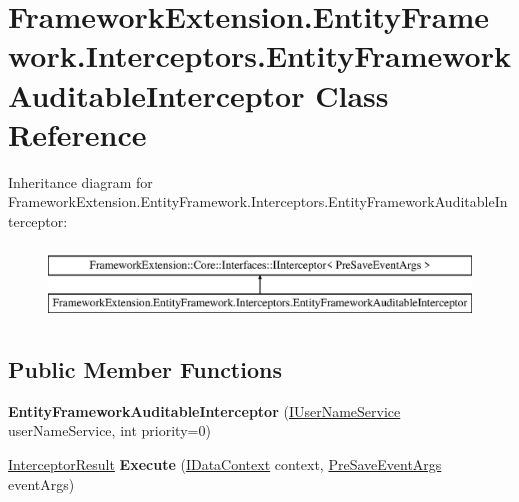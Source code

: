 \hypertarget{class_framework_extension_1_1_entity_framework_1_1_interceptors_1_1_entity_framework_auditable_interceptor}{\section{Framework\-Extension.\-Entity\-Framework.\-Interceptors.\-Entity\-Framework\-Auditable\-Interceptor Class Reference}
\label{class_framework_extension_1_1_entity_framework_1_1_interceptors_1_1_entity_framework_auditable_interceptor}
}
Inheritance diagram for Framework\-Extension.\-Entity\-Framework.\-Interceptors.\-Entity\-Framework\-Auditable\-Interceptor\-:\begin{figure}[H]
\begin{center}
\leavevmode
\includegraphics[height=2.000000cm]{class_framework_extension_1_1_entity_framework_1_1_interceptors_1_1_entity_framework_auditable_interceptor}
\end{center}
\end{figure}
\subsection*{Public Member Functions}
\begin{DoxyCompactItemize}
\item 
\hypertarget{class_framework_extension_1_1_entity_framework_1_1_interceptors_1_1_entity_framework_auditable_interceptor_a575bdb30c81c12e567676d17d170aff2}{{\bfseries Entity\-Framework\-Auditable\-Interceptor} (\hyperlink{interface_framework_extension_1_1_core_1_1_interfaces_1_1_i_user_name_service}{I\-User\-Name\-Service} user\-Name\-Service, int priority=0)}\label{class_framework_extension_1_1_entity_framework_1_1_interceptors_1_1_entity_framework_auditable_interceptor_a575bdb30c81c12e567676d17d170aff2}

\item 
\hypertarget{class_framework_extension_1_1_entity_framework_1_1_interceptors_1_1_entity_framework_auditable_interceptor_a55dd1ba5a9ca146e3fd0e8219f69f48b}{\hyperlink{struct_framework_extension_1_1_core_1_1_interceptors_1_1_interceptor_result}{Interceptor\-Result} {\bfseries Execute} (\hyperlink{interface_framework_extension_1_1_core_1_1_interfaces_1_1_i_data_context}{I\-Data\-Context} context, \hyperlink{class_framework_extension_1_1_core_1_1_interceptors_1_1_events_1_1_pre_save_event_args}{Pre\-Save\-Event\-Args} event\-Args)}\label{class_framework_extension_1_1_entity_framework_1_1_interceptors_1_1_entity_framework_auditable_interceptor_a55dd1ba5a9ca146e3fd0e8219f69f48b}

\end{DoxyCompactItemize}
